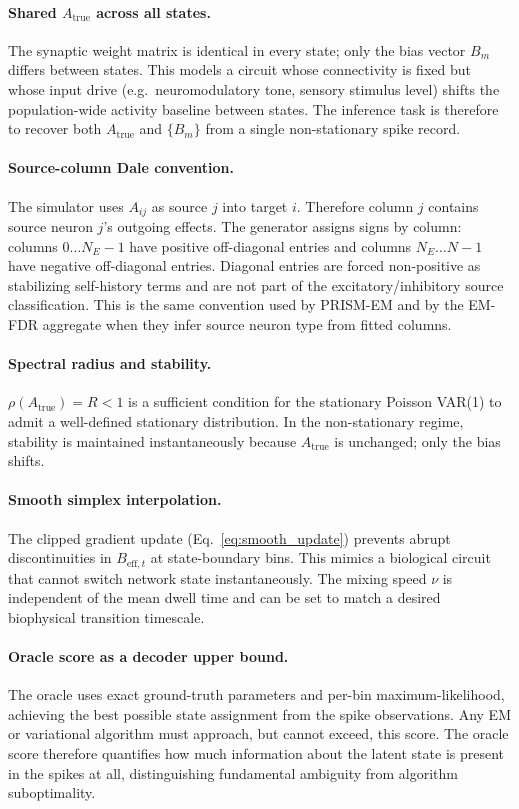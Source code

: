 \documentclass[11pt]{article}
\begin{document}
\paragraph{Shared $A_{\text{true}}$ across all states.}
The synaptic weight matrix is identical in every state; only the
bias vector $B_m$ differs between states.
This models a circuit whose connectivity is fixed but whose
input drive (e.g.\ neuromodulatory tone, sensory stimulus level)
shifts the population-wide activity baseline between states.
The inference task is therefore to recover both $A_{\text{true}}$
and $\{B_m\}$ from a single non-stationary spike record.

\paragraph{Source-column Dale convention.}
The simulator uses \(A_{ij}\) as source \(j\) into target \(i\). Therefore
column \(j\) contains source neuron \(j\)'s outgoing effects. The generator
assigns signs by column: columns \(0 \dots N_E - 1\) have positive
off-diagonal entries and columns \(N_E \dots N-1\) have negative
off-diagonal entries. Diagonal entries are forced non-positive as stabilizing
self-history terms and are not part of the excitatory/inhibitory source
classification. This is the same convention used by PRISM-EM and by the
EM-FDR aggregate when they infer source neuron type from fitted columns.

\paragraph{Spectral radius and stability.}
$\rho(A_{\text{true}}) = R < 1$ is a sufficient condition for
the stationary Poisson VAR(1) to admit a well-defined stationary
distribution.
In the non-stationary regime, stability is maintained instantaneously
because $A_{\text{true}}$ is unchanged; only the bias shifts.

\paragraph{Smooth simplex interpolation.}
The clipped gradient update (Eq.~\eqref{eq:smooth_update}) prevents
abrupt discontinuities in $B_{\mathrm{eff},t}$ at state-boundary
bins.
This mimics a biological circuit that cannot switch network state
instantaneously.
The mixing speed $\nu$ is independent of the mean dwell time and
can be set to match a desired biophysical transition timescale.

\paragraph{Oracle score as a decoder upper bound.}
The oracle uses exact ground-truth parameters and per-bin
maximum-likelihood, achieving the best possible state assignment
from the spike observations.
Any EM or variational algorithm must approach, but cannot exceed,
this score.
The oracle score therefore quantifies how much information about
the latent state is present in the spikes at all, distinguishing
fundamental ambiguity from algorithm suboptimality.
\end{document}
